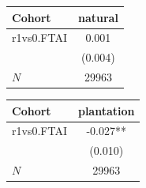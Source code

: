 {
\def\sym#1{\ifmmode^{#1}\else\(^{#1}\)\fi}
\begin{tabular}{l*{1}{c}}
\toprule
Cohort    &  natural   \\
\midrule
r1vs0.FTAI&    0.001   \\
          &  (0.004)   \\
\midrule
\(N\)     &    29963   \\
\bottomrule
\end{tabular}
}
{
\def\sym#1{\ifmmode^{#1}\else\(^{#1}\)\fi}
\begin{tabular}{l*{1}{c}}
\toprule
Cohort    &plantation   \\
\midrule
r1vs0.FTAI&   -0.027** \\
          &  (0.010)   \\
\midrule
\(N\)     &    29963   \\
\bottomrule
\end{tabular}
}
